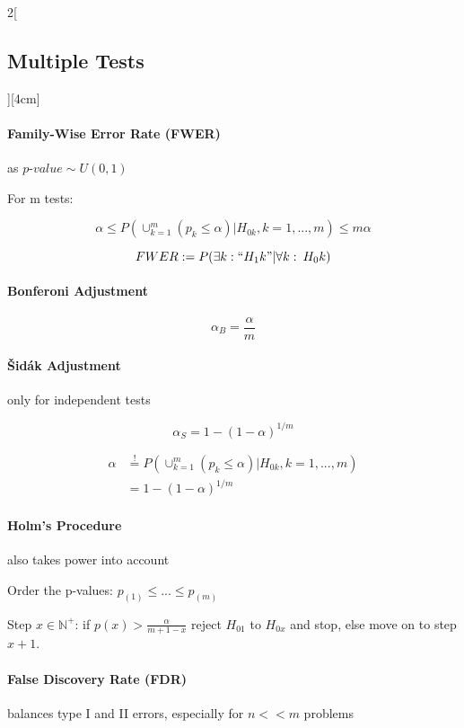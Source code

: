 \documentclass[8pt]{extarticle}
\begin{document}
\begin{multicols}{2}[\subsection{Multiple Tests}][4cm]

\paragraph{Family-Wise Error Rate (FWER)}
as $p\text{-}value \sim U(0,1)$

For m tests:

$$\alpha \leq P\left(\cup_{k=1}^m (p_k \leq \alpha)| H_{0k},k=1,...,m\right) \leq m\alpha$$

$$FWER := P(\exists k: ``H_1k"|\forall k:\: H_0k)$$


\paragraph{Bonferoni Adjustment} 

$$\alpha_{B} = \frac{\alpha}{m}$$

\paragraph{\v{S}id\'{a}k Adjustment} only for independent tests

$$\alpha_{S} = 1- (1-\alpha)^{1/m}$$

\begin{Proof}
\vspace{-1.5em}
\begin{align*}
 \alpha &\overset{!}{=} P\left(\cup_{k=1}^m (p_k \leq \alpha)| H_{0k},k=1,...,m\right)\\
 &= 1- (1-\alpha)^{1/m}
\end{align*}
\end{Proof}

\paragraph{Holm's Procedure} also takes power into account

\noindent Order the p-values: $p_{(1)} \leq...\leq p_{(m)} $

\noindent Step $x \in \mathbb{N}^+$: if $p(x) > \frac{\alpha}{m + 1 - x}$ reject $H_{01}$ to $H_{0x}$ and stop, else move on to step $x+1$. 

\paragraph{False Discovery Rate (FDR)} balances type I and II errors, especially for $n<<m$ problems


\end{multicols}
\end{document}
